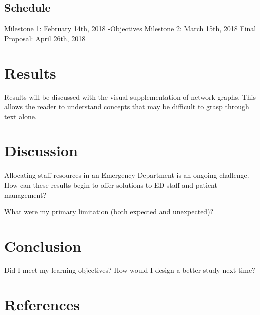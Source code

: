 \documentclass[]{elsarticle} %
\begin{document}
\subsection{Schedule}\label{schedule}

Milestone 1: February 14th, 2018 -Objectives Milestone 2: March 15th,
2018 Final Proposal: April 26th, 2018

\section{Results}\label{results}

Results will be discussed with the visual supplementation of network
graphs. This allows the reader to understand concepts that may be
difficult to grasp through text alone.

\section{Discussion}\label{discussion}

Allocating staff resources in an Emergency Department is an ongoing
challenge. How can these results begin to offer solutions to ED staff
and patient management?

What were my primary limitation (both expected and unexpected)?

\section{Conclusion}\label{conclusion}

Did I meet my learning objectives? How would I design a better study
next time?

\section{References}\label{references.unnumbered}
\end{document}
